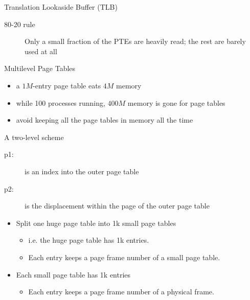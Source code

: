 \begin{frame}{Translation Lookaside Buffer (TLB)}
  \begin{description}
  \item[80-20 rule] Only a small fraction of the PTEs are heavily read; the rest are
    barely used at all
  \end{description}
  \begin{center}
  \end{center}
\end{frame}

\begin{frame}{Multilevel Page Tables}
  \begin{itemize}
  \item a $1M$-entry page table eats $4M$ memory
  \item while 100 processes running, $400M$ memory is gone for page tables
  \item avoid keeping all the page tables in memory all the time
  \end{itemize}
  \begin{block}{A two-level scheme}
    \begin{center}
    \end{center}
  \end{block}
\end{frame}

\begin{description}
\item[p1:] is an index into the outer page table
\item[p2:] is the displacement within the page of the outer page table
\end{description}

\begin{itemize}
\item Split one huge page table into 1k small page tables
  \begin{itemize}
  \item i.e. the huge page table has 1k entries.
  \item Each entry keeps a page frame number of a small page table.
  \end{itemize}
\item Each small page table has 1k entries
  \begin{itemize}
  \item Each entry keeps a page frame number of a physical frame.
  \end{itemize}
\end{itemize}

